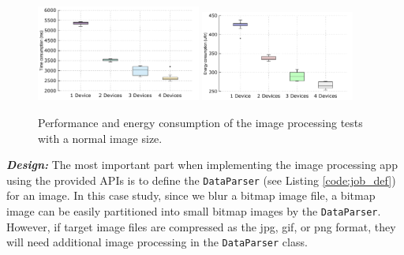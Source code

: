 \documentclass{sig-alternate}
\begin{document}
\begin{figure}
	\centering
		\includegraphics[width=0.48\textwidth]{data/img_small_perf_full.pdf}
		\includegraphics[width=0.45\textwidth]{data/img_small_energy.pdf}
	\caption{Performance and energy consumption of the image processing tests with a normal image size.}
	\label{fig:small_img_perf}
\end{figure}


\textbf{\emph{Design:}}
The most important part when implementing the image processing app using the provided APIs is to define the \texttt{DataParser} (see Listing \ref{code:job_def}) for an image. In this case study, since we blur a bitmap image file, a bitmap image can be easily partitioned into small bitmap images by the \texttt{DataParser}. However, if target image files are compressed as the jpg, gif, or png format, they will need additional image processing in the \texttt{DataParser} class.


%
%
%
\end{document}
